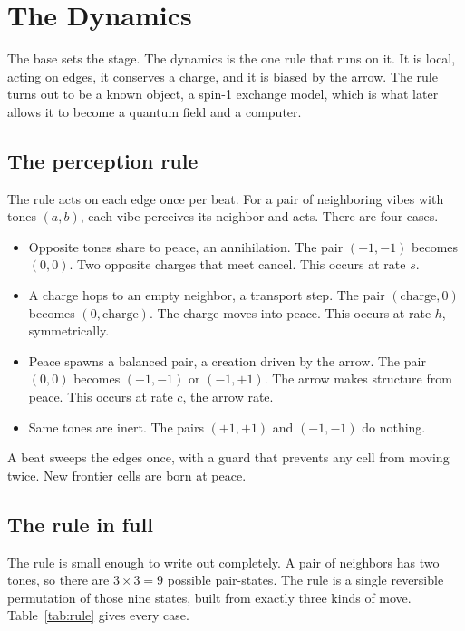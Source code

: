 \section{The Dynamics}

The base sets the stage. The dynamics is the one rule that runs on it. It is local, acting on edges, it conserves a charge, and it is biased by the arrow. The rule turns out to be a known object, a spin-1 exchange model, which is what later allows it to become a quantum field and a computer.

\subsection{The perception rule}

The rule acts on each edge once per beat. For a pair of neighboring vibes with tones $(a, b)$, each vibe perceives its neighbor and acts. There are four cases.

\begin{itemize}
  \item Opposite tones share to peace, an annihilation. The pair $(+1, -1)$ becomes $(0, 0)$. Two opposite charges that meet cancel. This occurs at rate $s$.
  \item A charge hops to an empty neighbor, a transport step. The pair $(\text{charge}, 0)$ becomes $(0, \text{charge})$. The charge moves into peace. This occurs at rate $h$, symmetrically.
  \item Peace spawns a balanced pair, a creation driven by the arrow. The pair $(0, 0)$ becomes $(+1, -1)$ or $(-1, +1)$. The arrow makes structure from peace. This occurs at rate $c$, the arrow rate.
  \item Same tones are inert. The pairs $(+1, +1)$ and $(-1, -1)$ do nothing.
\end{itemize}

A beat sweeps the edges once, with a guard that prevents any cell from moving twice. New frontier cells are born at peace.

\subsection{The rule in full}

The rule is small enough to write out completely. A pair of neighbors has two tones, so there are $3 \times 3 = 9$ possible pair-states. The rule is a single reversible permutation of those nine states, built from exactly three kinds of move. Table~\ref{tab:rule} gives every case.

